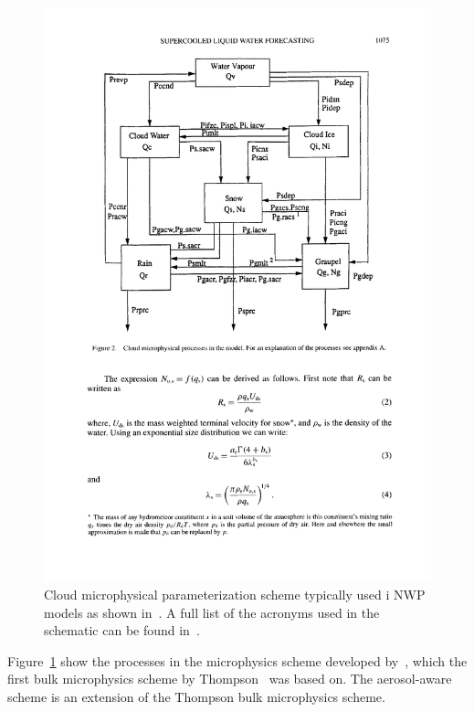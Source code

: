 \begin{figure}
\centering
\includegraphics[scale=0.8]{model_methods/microphysics.pdf}
\caption{Cloud microphysical parameterization scheme typically used i NWP models as shown in~\citet{Reisner1998}. A full list of the acronyms used in the schematic can be found in~\citet{Reisner1998}.}
\label{fig:microphysics}
\end{figure}

Figure~\ref{fig:microphysics} show the processes in the microphysics scheme developed by~\citet{Reisner1998}, which the first bulk microphysics scheme by Thompson~\citep{Thompson2004} was based on. The aerosol-aware scheme is an extension of the Thompson bulk microphysics scheme.%

